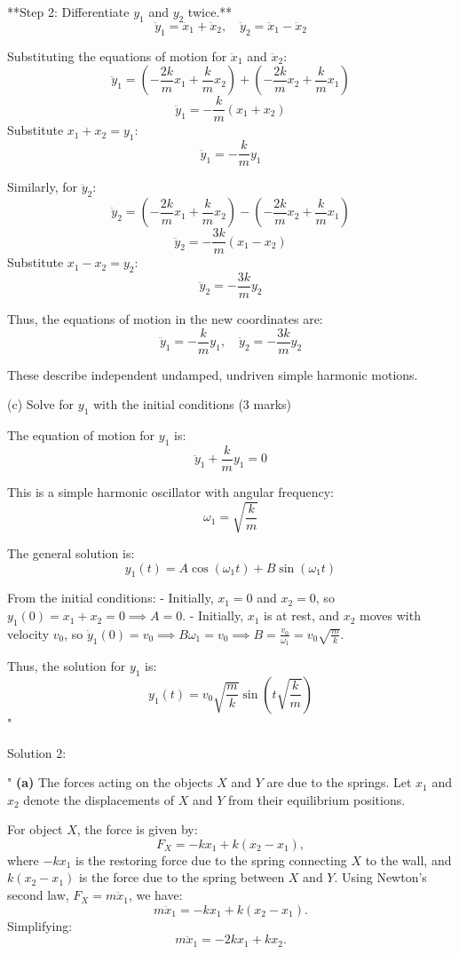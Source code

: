 **Step 2: Differentiate $y_1$ and $y_2$ twice.**
\[
\ddot{y}_1 = \ddot{x}_1 + \ddot{x}_2, \quad \ddot{y}_2 = \ddot{x}_1 - \ddot{x}_2
\]

Substituting the equations of motion for $\ddot{x}_1$ and $\ddot{x}_2$:
\[
\ddot{y}_1 = \left(-\frac{2k}{m} x_1 + \frac{k}{m} x_2\right) + \left(-\frac{2k}{m} x_2 + \frac{k}{m} x_1\right)
\]
\[
\ddot{y}_1 = -\frac{k}{m}(x_1 + x_2)
\]
Substitute $x_1 + x_2 = y_1$:
\[
\ddot{y}_1 = -\frac{k}{m} y_1
\]

Similarly, for $\ddot{y}_2$:
\[
\ddot{y}_2 = \left(-\frac{2k}{m} x_1 + \frac{k}{m} x_2\right) - \left(-\frac{2k}{m} x_2 + \frac{k}{m} x_1\right)
\]
\[
\ddot{y}_2 = -\frac{3k}{m}(x_1 - x_2)
\]
Substitute $x_1 - x_2 = y_2$:
\[
\ddot{y}_2 = -\frac{3k}{m} y_2
\]

Thus, the equations of motion in the new coordinates are:
\[
\ddot{y}_1 = -\frac{k}{m} y_1, \quad \ddot{y}_2 = -\frac{3k}{m} y_2
\]

These describe independent undamped, undriven simple harmonic motions.

(c) Solve for $y_1$ with the initial conditions (3 marks)

The equation of motion for $y_1$ is:
\[
\ddot{y}_1 + \frac{k}{m} y_1 = 0
\]

This is a simple harmonic oscillator with angular frequency:
\[
\omega_1 = \sqrt{\frac{k}{m}}
\]

The general solution is:
\[
y_1(t) = A \cos(\omega_1 t) + B \sin(\omega_1 t)
\]

From the initial conditions:
- Initially, $x_1 = 0$ and $x_2 = 0$, so $y_1(0) = x_1 + x_2 = 0 \implies A = 0$.
- Initially, $x_1$ is at rest, and $x_2$ moves with velocity $v_0$, so $\dot{y}_1(0) = v_0 \implies B \omega_1 = v_0 \implies B = \frac{v_0}{\omega_1} = v_0 \sqrt{\frac{m}{k}}$.

Thus, the solution for $y_1$ is:
\[
y_1(t) = v_0 \sqrt{\frac{m}{k}} \sin\left(t \sqrt{\frac{k}{m}}\right)
\]"

Solution 2: 

"
\textbf{(a)} The forces acting on the objects $X$ and $Y$ are due to the springs. Let $x_1$ and $x_2$ denote the displacements of $X$ and $Y$ from their equilibrium positions.

For object $X$, the force is given by:
\[
F_X = -k x_1 + k (x_2 - x_1),
\]
where $-k x_1$ is the restoring force due to the spring connecting $X$ to the wall, and $k (x_2 - x_1)$ is the force due to the spring between $X$ and $Y$. Using Newton's second law, $F_X = m \ddot{x}_1$, we have:
\[
m \ddot{x}_1 = -k x_1 + k (x_2 - x_1).
\]
Simplifying:
\[
m \ddot{x}_1 = -2k x_1 + k x_2. \tag{1}
\]

